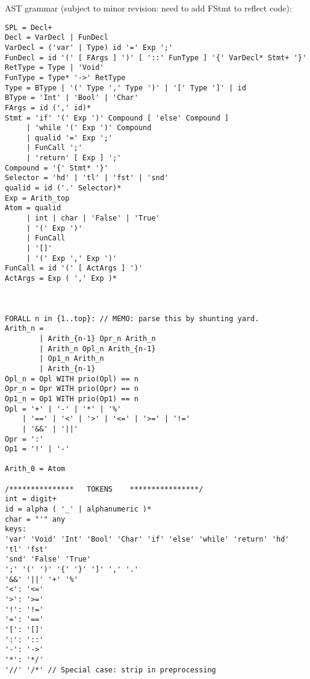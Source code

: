 \documentclass{report}
\begin{document}
AST grammar (subject to minor revision: need to add FStmt to reflect code):
\begin{verbatim}
SPL = Decl+
Decl = VarDecl | FunDecl
VarDecl = ('var' | Type) id '=' Exp ';'
FunDecl = id '(' [ FArgs ] ')' [ '::' FunType ] '{' VarDecl* Stmt+ '}'
RetType = Type | 'Void'
FunType = Type* '->' RetType
Type = BType | '(' Type ',' Type ')' | '[' Type ']' | id
BType = 'Int' | 'Bool' | 'Char'
FArgs = id (',' id)*
Stmt = 'if' '(' Exp ')' Compound [ 'else' Compound ]
     | 'while '(' Exp ')' Compound
     | qualid '=' Exp ';'
     | FunCall ';'
     | 'return' [ Exp ] ';'
Compound = '{' Stmt* '}'
Selector = 'hd' | 'tl' | 'fst' | 'snd'
qualid = id ('.' Selector)*
Exp = Arith_top
Atom = qualid
     | int | char | 'False' | 'True'
     | '(' Exp ')'
     | FunCall
     | '[]'
     | '(' Exp ',' Exp ')'
FunCall = id '(' [ ActArgs ] ')'
ActArgs = Exp ( ',' Exp )*



FORALL n in {1..top}: // MEMO: parse this by shunting yard.
Arith_n = 
        | Arith_{n-1} Opr_n Arith_n
        | Arith_n Opl_n Arith_{n-1}
        | Op1_n Arith_n
        | Arith_{n-1}
Opl_n = Opl WITH prio(Opl) == n
Opr_n = Opr WITH prio(Opr) == n
Op1_n = Op1 WITH prio(Op1) == n
Opl = '+' | '-' | '*' | '%'
    | '==' | '<' | '>' | '<=' | '>=' | '!='
    | '&&' | '||'
Opr = ':'
Op1 = '!' | '-'

Arith_0 = Atom

/***************   TOKENS    ****************/
int = digit+
id = alpha ( '_' | alphanumeric )*
char = "'" any
keys:
'var' 'Void' 'Int' 'Bool' 'Char' 'if' 'else' 'while' 'return' 'hd' 'tl' 'fst'
'snd' 'False' 'True' 
';' '(' ')' '{' '}' ']' ',' '.' 
'&&' '||' '+' '%' 
'<': '<='
'>': '>='
'!': '!='
'=': '=='
'[': '[]'
':': '::'
'-': '->'
'*': '*/'
'//' '/*' // Special case: strip in preprocessing
\end{verbatim}
\end{document}
